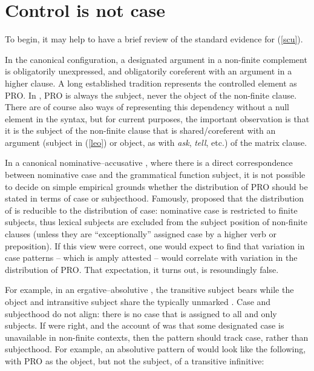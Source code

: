 \documentclass[output=paper]{langsci/langscibook}
\begin{document}
\section{Control is not case}

To begin, it may help to have a brief review of the standard evidence for
(\ref{scu}).

In the canonical  configuration, a designated argument in a non-finite
complement is obligatorily unexpressed, and obligatorily coreferent with an
argument in a higher clause. A long established tradition represents the
controlled element as PRO. In , PRO is always the subject, never the
object of the non-finite clause. There are of course also ways of representing
this dependency without a null element in the syntax, but for current purposes,
the important observation is that it is the subject of the non-finite clause
that is shared/coreferent with an argument (subject in (\ref{leo}) or object,
as with \emph{ask}, \emph{tell}, etc.) of the matrix clause.

\ea \label{leo}	\begin{xlista}
	\end{xlista}
\z

In a canonical nominative--accusative , where there is a direct
correspondence between nominative case and the grammatical function subject, it
is not possible to decide on simple empirical grounds whether the distribution
of PRO should be stated in terms of case or subjecthood. Famously,
\citet{Vergnaud1977,Chomsky1980} proposed that the distribution of  is
reducible to the distribution of case:  nominative case is restricted to
finite subjects, thus lexical subjects are excluded from the subject position
of non-finite clauses (unless they are \enquote{exceptionally} assigned case by
a higher verb or preposition).  If this view were correct, one would expect to
find that variation in case patterns -- which is amply attested -- would
correlate with variation in the distribution of PRO. That expectation, it turns
out, is resoundingly false.

For example, in an ergative--absolutive , the transitive subject
bears  while the object and intransitive subject share the
typically unmarked . Case and subjecthood do not align:
there is no case that is assigned to all and only subjects. If
\citeauthor{Vergnaud1977} were right, and the account of  was that
some designated case is unavailable in non-finite contexts, then the
 pattern should track case, rather than subjecthood.  For example,
an absolutive pattern of  would look like
the following, with PRO as the object, but not the subject, of a transitive
infinitive:
\end{document}

